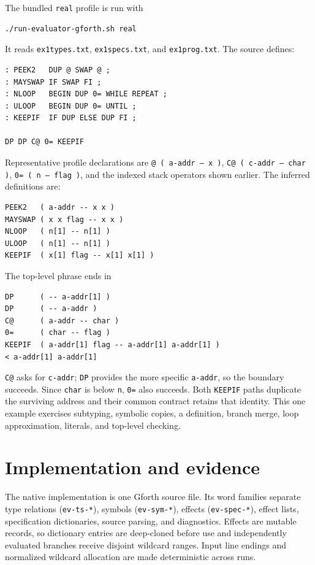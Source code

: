 \documentclass[10pt,a4paper]{article}
\begin{document}
The bundled \texttt{real} profile is run with
\begin{lstlisting}
./run-evaluator-gforth.sh real
\end{lstlisting}
It reads \texttt{ex1types.txt}, \texttt{ex1specs.txt}, and
\texttt{ex1prog.txt}.  The source defines:
\begin{lstlisting}
: PEEK2   DUP @ SWAP @ ;
: MAYSWAP IF SWAP FI ;
: NLOOP   BEGIN DUP 0= WHILE REPEAT ;
: ULOOP   BEGIN DUP 0= UNTIL ;
: KEEPIF  IF DUP ELSE DUP FI ;

DP DP C@ 0= KEEPIF
\end{lstlisting}
Representative profile declarations are \texttt{@ ( a-addr -- x )},
\texttt{C@ ( c-addr -- char )}, \texttt{0= ( n -- flag )}, and the indexed
stack operators shown earlier.  The inferred definitions are:
\begin{lstlisting}
PEEK2   ( a-addr -- x x )
MAYSWAP ( x x flag -- x x )
NLOOP   ( n[1] -- n[1] )
ULOOP   ( n[1] -- n[1] )
KEEPIF  ( x[1] flag -- x[1] x[1] )
\end{lstlisting}
The top-level phrase ends in
\begin{lstlisting}
DP      ( -- a-addr[1] )
DP      ( -- a-addr )
C@      ( a-addr -- char )
0=      ( char -- flag )
KEEPIF  ( a-addr[1] flag -- a-addr[1] a-addr[1] )
< a-addr[1] a-addr[1]
\end{lstlisting}
\texttt{C@} asks for \texttt{c-addr}; \texttt{DP} provides the more specific
\texttt{a-addr}, so the boundary succeeds.  Since \texttt{char} is below
\texttt{n}, \texttt{0=} also succeeds.  Both \texttt{KEEPIF} paths duplicate
the surviving address and their common contract retains that identity.  This
one example exercises subtyping, symbolic copies, a definition, branch merge,
loop approximation, literals, and top-level checking.

\section{Implementation and evidence}

The native implementation is one Gforth source file.  Its word families
separate type relations (\texttt{ev-ts-*}), symbols (\texttt{ev-sym-*}),
effects (\texttt{ev-spec-*}), effect lists, specification dictionaries,
source parsing, and diagnostics.  Effects are mutable records, so dictionary
entries are deep-cloned before use and independently evaluated branches receive
disjoint wildcard ranges.  Input line endings and normalized wildcard
allocation are made deterministic across runs.
\end{document}
